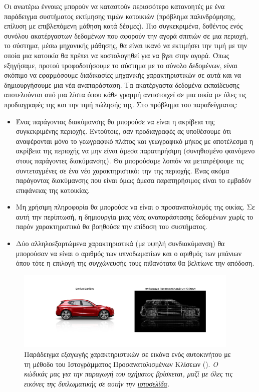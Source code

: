 Οι ανωτέρω έννοιες μπορούν να καταστούν περισσότερο κατανοητές με ένα παράδειγμα συστήματος εκτίμησης τιμών κατοικιών\cite{geron2019hands} (πρόβλημα παλινδρόμησης, επίλυση με επιβλεπόμενη μάθηση κατά δέσμες). Πιο συγκεκριμένα, δοθέντος ενός συνόλου ακατέργαστων δεδομένων που αφορούν την αγορά σπιτιών σε μια περιοχή, το σύστημα, μέσω μηχανικής μάθησης, θα είναι ικανό να εκτιμήσει την τιμή με την οποία μια κατοικία θα πρέπει να κοστολογηθεί για να βγει στην αγορά. Όπως εξηγήσαμε, προτού τροφοδοτήσουμε το σύστημα με το σύνολο δεδομένων, είναι σκόπιμο να εφαρμόσουμε διαδικασίες μηχανικής χαρακτηριστικών σε αυτά και να δημιουργήσουμε μια νέα αναπαράσταση. Τα ακατέργαστα δεδομένα εκπαίδευσης αποτελούνται από μια λίστα όπου κάθε γραμμή αντιστοιχεί σε μια οικία με όλες τις προδιαγραφές της και την τιμή πώλησής της. Στο πρόβλημα του παραδείγματος:
\begin{itemize}
    \item  Ένας παράγοντας διακύμανσης θα μπορούσε να είναι η ακρίβεια της συγκεκριμένης περιοχής. Εντούτοις, σαν προδιαγραφές ας υποθέσουμε ότι αναφέρονται μόνο το γεωγραφικό πλάτος και γεωγραφικό μήκος με αποτέλεσμα η ακρίβεια της περιοχής να μην είναι άμεσα παρατηρήσιμη (συνηθισμένο φαινόμενο στους παράγοντες διακύμανσης). Θα μπορούσαμε λοιπόν να μετατρέψουμε τις συντεταγμένες σε ένα νέο χαρακτηριστικό: την  της περιοχής. Ένας ακόμα παράγοντας διακύμανσης που είναι όμως άμεσα παρατηρήσιμος είναι το εμβαδόν επιφάνειας της κατοικίας.
 \item Μη χρήσιμη πληροφορία θα μπορούσε να είναι ο προσανατολισμός της οικίας. Σε αυτή την περίπτωσή, η δημιουργία μιας νέας αναπαράστασης δεδομένων χωρίς το παρόν χαρακτηριστικό θα βοηθούσε την επίδοση του συστήματος. 
 \item Δύο αλληλοεξαρτώμενα χαρακτηριστικά (με υψηλή συν\textendash διακύμανση) θα μπορούσαν να είναι ο αριθμός των υπνοδωματίων και ο αριθμός των μπάνιων όπου τότε η επιλογή της συγχώνευσής τους πιθανότατα θα βελτίωνε την απόδοση. 
\end{itemize}
\par

\begin{figure}[h]
  \centering
  \includegraphics[width=0.95\textwidth]{images/chapter theoritical background/hog_gr.pdf}
  \caption{Παράδειγμα εξαγωγής χαρακτηριστικών σε εικόνα ενός αυτοκινήτου με τη μέθοδο του Ιστογράμματος Προσανατολισμένων Κλίσεων (). \textit{Ο κώδικάς μας για την παραγωγή του σχήματος βρίσκεται, μαζί με όλες τις εικόνες της διπλωματικής σε αυτήν την \href{https://github.com/abarmper/Thesis_Barmperis}{ιστοσελίδα}.}}
  \label{fig:_hog}
\end{figure}

